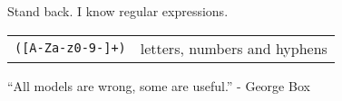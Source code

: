 \vfill
Stand back. I know regular expressions.
\bigskip
\begin{tabular}{ll}
\texttt{([A-Za-z0-9-]+)}&letters, numbers and hyphens\\
\end{tabular}
\vfill
``All models are wrong, some are useful.'' - George Box
\vfill
\clearpage

